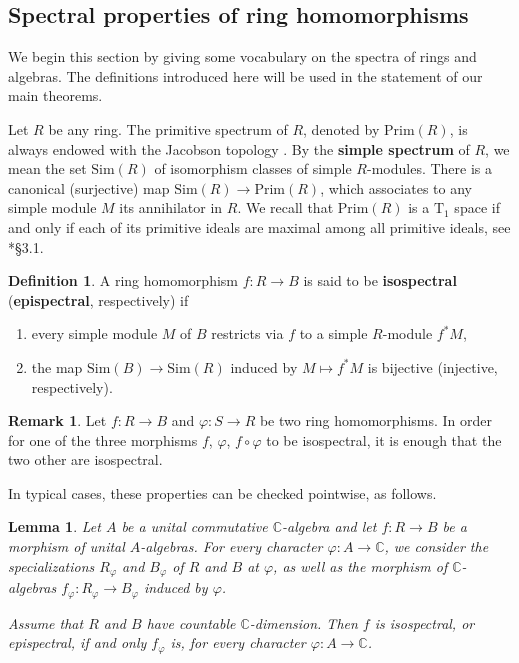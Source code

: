 \documentclass{amsart}
\newtheorem{lemma}[theorem]{Lemma}
\theoremstyle{definition}
\newtheorem{definition}[theorem]{Definition}
\newtheorem{remark}[theorem]{Remark}
\begin{document}
\subsection{Spectral properties of ring homomorphisms}\label{spectral_properties_rings}

We begin this section by giving some vocabulary on the spectra of rings and algebras. The definitions introduced here will be used in the statement of our main theorems.

Let $R$ be any ring. The primitive spectrum of $R$, denoted by $\mathrm{Prim}(R)$, is always endowed with the Jacobson topology \cite{Jacobson}. By the \textbf{simple spectrum} of $R$, we mean the set $\mathrm{Sim}(R)$ of isomorphism classes of simple $R$-modules. There is a canonical (surjective) map $\mathrm{Sim}(R) \to \mathrm{Prim}(R)$, which associates to any simple module $M$ its annihilator in $R$. We recall that $\mathrm{Prim}(R)$ is a $\mathrm{T_1}$ space if and only if each of its primitive ideals are maximal among all primitive ideals, see \cite{Dixmier}*{§3.1}.

\begin{definition}\label{isospectral}
    A ring homomorphism $f : R \to B$ is said to be \textbf{isospectral} (\textbf{epispectral}, respectively) if
    \begin{enumerate}
        \item every simple module $M$ of $B$ restricts via $f$ to a simple $R$-module $f^*M$,
        \item the map $\mathrm{Sim}(B) \to \mathrm{Sim}(R)$ induced by $M \mapsto f^*M$ is bijective (injective, respectively).
    \end{enumerate}
\end{definition}

\begin{remark}\label{two_out_of_three}
    Let $f: R \to B$ and $\varphi : S \to R$ be two ring homomorphisms. In order for one of the three morphisms $f$, $\varphi$, $f\circ \varphi$ to be isospectral, it is enough that the two other are isospectral.
\end{remark}

In typical cases, these properties can be checked pointwise, as follows.

\begin{lemma}\label{isospectral_specializations}
    Let $A$ be a unital commutative $\mathbb{C}$-algebra and let $f : R \to B$ be a morphism of unital $A$-algebras. For every character $\varphi : A \to \mathbb{C}$, we consider the specializations $R_\varphi$ and $B_\varphi$ of $R$ and $B$ at $\varphi$, as well as the morphism of $\mathbb{C}$-algebras $f_\varphi : R_\varphi \to B_\varphi$ induced by $\varphi$.

    Assume that $R$ and $B$ have countable $\mathbb{C}$-dimension. Then $f$ is isospectral, or epispectral, if and only $f_\varphi$ is, for every character $\varphi : A \to \mathbb{C}$.
\end{lemma}
\end{document}
